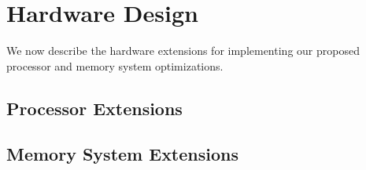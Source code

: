 \section{Hardware Design}
\label{sec:design}

We now describe the hardware extensions for implementing our proposed processor and memory system optimizations.

\subsection{Processor Extensions}



\subsection{Memory System Extensions}
